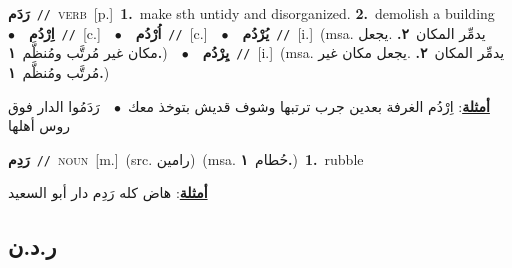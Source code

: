 \documentclass[10pt,a4paper,twoside]{article} %
\begin{document}
\begin{multicols}{2}
{\setlength\topsep{0pt}\textbf{\foreignlanguage{arabic}{رَدَم}}\ {\color{gray}\texttt{//}\color{black}}\ \textsc{verb}\ [p.]\ \textbf{1.}~make sth untidy and disorganized.  \textbf{2.}~demolish a building\ \ $\bullet$\ \ \setlength\topsep{0pt}\textbf{\foreignlanguage{arabic}{اِرْدُم}}\ {\color{gray}\texttt{//}\color{black}}\ [c.]\ \ $\bullet$\ \ \setlength\topsep{0pt}\textbf{\foreignlanguage{arabic}{اُرْدُم}}\ {\color{gray}\texttt{//}\color{black}}\ [c.]\ \ $\bullet$\ \ \setlength\topsep{0pt}\textbf{\foreignlanguage{arabic}{يُرْدُم}}\ {\color{gray}\texttt{//}\color{black}}\ [i.]\ \color{gray}(msa. \foreignlanguage{arabic}{يدمِّر المكان}~\foreignlanguage{arabic}{\textbf{٢.}}  .\foreignlanguage{arabic}{يجعل مكان غير مُرتَّب ومُنظَّم}~\foreignlanguage{arabic}{\textbf{١.}})\color{black}\ \ $\bullet$\ \ \setlength\topsep{0pt}\textbf{\foreignlanguage{arabic}{يِرْدُم}}\ {\color{gray}\texttt{//}\color{black}}\ [i.]\ \color{gray}(msa. \foreignlanguage{arabic}{يدمِّر المكان}~\foreignlanguage{arabic}{\textbf{٢.}}  .\foreignlanguage{arabic}{يجعل مكان غير مُرتَّب ومُنظَّم}~\foreignlanguage{arabic}{\textbf{١.}})\color{black}\  \begin{flushright}\color{gray}\foreignlanguage{arabic}{\textbf{\underline{\foreignlanguage{arabic}{أمثلة}}}: اِرْدُم الغرفة بعدين جرب ترتبها وشوف قديش بتوخذ معك\ $\bullet$\ \  رَدَمُوا الدار فوق روس أهلها}\end{flushright}\color{black}} \vspace{2mm}

{\setlength\topsep{0pt}\textbf{\foreignlanguage{arabic}{رَدِم}}\ {\color{gray}\texttt{//}\color{black}}\ \textsc{noun}\ [m.]\ (src. \color{gray}\foreignlanguage{arabic}{رامين}\color{black})\ \color{gray}(msa. \foreignlanguage{arabic}{حُطام}~\foreignlanguage{arabic}{\textbf{١.}})\color{black}\ \textbf{1.}~rubble\  \begin{flushright}\color{gray}\foreignlanguage{arabic}{\textbf{\underline{\foreignlanguage{arabic}{أمثلة}}}: هاض كله رَدِم دار أبو السعيد}\end{flushright}\color{black}} \vspace{2mm}

\vspace{-3mm}
\subsection*{\color{blue}\foreignlanguage{arabic}{ر.د.ن}\color{blue}{}} 


\end{multicols}
\end{document}
